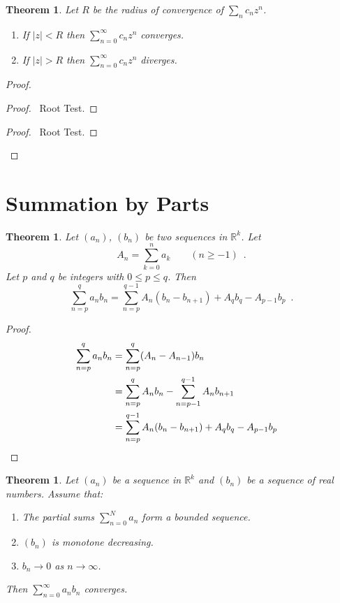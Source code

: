 \documentclass{book}
\let\qed\relax
\newtheorem{thm}[prop]{Theorem}
\theoremstyle{definition}
\begin{document}
\begin{thm}
Let $R$ be the radius of convergence of $\sum_n c_n z^n$.
\begin{enumerate}
\item If $|z| < R$ then $\sum_{n=0}^\infty c_n z^n$ converges.
\item If $|z| > R$ then $\sum_{n=0}^\infty c_n z^n$ diverges.
\end{enumerate}
\end{thm}

\begin{proof}
\pf
{}
\begin{proof}
	\pf\ Root Test.
\end{proof}
\begin{proof}
	\pf\ Root Test.
\end{proof}
\qed
\end{proof}

\section{Summation by Parts}

\begin{thm}
Let $(a_n)$, $(b_n)$ be two sequences in $\mathbb{R}^k$. Let
\[ A_n = \sum_{k=0}^n a_k \qquad (n \geq -1) \enspace . \]
Let $p$ and $q$ be integers with $0 \leq p \leq q$. Then
\[ \sum_{n=p}^q a_n b_n = \sum_{n=p}^{q-1} A_n (b_n - b_{n+1}) + A_q b_q - A_{p-1} b_p \enspace .\]
\end{thm}

\begin{proof}
\pf
\begin{align*}
\sum_{n=p}^q a_n b_n & = \sum_{n=p}^q (A_n - A_{n-1}) b_n \\
& = \sum_{n=p}^q A_n b_n - \sum_{n=p-1}^{q-1} A_n b_{n+1} \\
& = \sum_{n=p}^{q-1} A_n (b_n - b_{n+1}) + A_q b_q - A_{p-1} b_p & \qed
\end{align*}
\end{proof}

\begin{thm}
\label{thm:sum_an_bn_converges}
Let $(a_n)$ be a sequence in $\mathbb{R}^k$ and $(b_n)$ be a sequence of real numbers. Assume that:
\begin{enumerate}
\item The partial sums $\sum_{n=0}^N a_n$ form a bounded sequence.
\item $(b_n)$ is monotone decreasing.
\item $b_n \rightarrow 0$ as $n \rightarrow \infty$.
\end{enumerate}
Then $\sum_{n=0}^\infty a_n b_n$ converges.
\end{thm}
\end{document}
